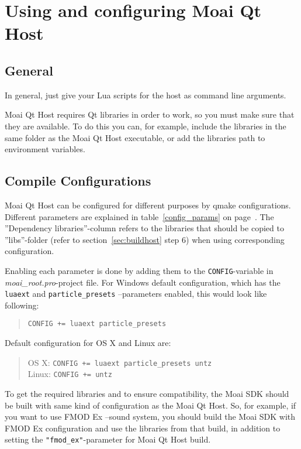 \chapter{Using and configuring Moai Qt Host}
\label{chap:using}

\section{General}
\label{sec:gen}

In general, just give your Lua scripts for the host as command line arguments. 

Moai Qt Host requires Qt libraries in order to work, so you must make sure that they are available.
To do this you can, for example, include the libraries in the same folder as the Moai Qt Host executable, or add the libraries path to environment variables.



\section{Compile Configurations}
\label{sec:compile_config}

Moai Qt Host can be configured for different purposes by qmake configurations.
Different parameters are explained in table~\ref{config_params} on page~\pageref{config_params}.
The ''Dependency libraries''-column refers to the libraries that should be copied to ''libs''-folder (refer to section~\ref{sec:buildhost} step 6) when using corresponding configuration.

Enabling each parameter is done by adding them to the \texttt{CONFIG}-variable in \textit{moai\_root.pro}-project file.
For Windows default configuration, which has the \texttt{luaext} and \texttt{particle\_presets} --parameters enabled, this would look like following: 
\begin{quote}
\texttt{CONFIG += luaext particle\_presets}
\end{quote}

\pagebreak %
Default configuration for OS X and Linux are:
\begin{quote}
OS X:  \texttt{CONFIG += luaext particle\_presets untz}\\
Linux: \texttt{CONFIG += untz}
\end{quote}

To get the required libraries and to ensure compatibility, the Moai SDK should be built with same kind of configuration as the Moai Qt Host. 
So, for example, if you want to use FMOD Ex --sound system, you should build the Moai SDK with FMOD Ex configuration and use the libraries from that build, in addition to setting the \texttt{"fmod\_ex"}-parameter for Moai Qt Host build.

